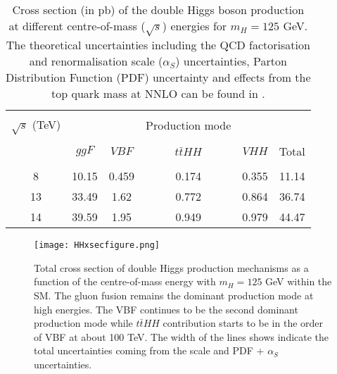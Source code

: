 \begin{table*}[ht]
	{\setlength{\tabcolsep}{14pt}
		\caption[Cross section (in pb) of the double Higgs boson production at different centre-of-mass ($\sqrt{s}$) energies for $m_H=125$ GeV. The theoretical uncertainties including the QCD factorisation and renormalisation scale ($\alpha_S$) uncertainties, Parton Distribution Function (PDF) uncertainty and effects from the top quark mass at NNLO can be found in the reference.]{Cross section (in pb) of the double Higgs boson production at different centre-of-mass ($\sqrt{s}$) energies for $m_H=125$ GeV. The theoretical uncertainties including the QCD factorisation and renormalisation scale ($\alpha_S$) uncertainties, Parton Distribution Function (PDF) uncertainty and effects from the top quark mass at NNLO can be found in \cite{higgs-br-vs-mH}.}
		\begin{center}
			\vspace{-6mm}
			\begin{tabular}{cccccc}
				\hline \\[-2.45ex] \hline \\[-2.1ex]
				$\sqrt{s}$ (TeV) &&&Production mode&&\\
				\hline \\[-1.8ex]
				& $ggF$ & $VBF$ & $t\bar tHH$ & $VHH$ & Total \\
				\hline \\[-1.8ex]
                8 & 10.15 & 0.459 & 0.174 & 0.355 & 11.14 \\
                13 & 33.49 & 1.62 & 0.772 & 0.864 & 36.74 \\
                14 & 39.59 & 1.95 & 0.949 & 0.979 & 44.47 \\
				\hline
			\end{tabular}
			\vspace{-6mm}
		\end{center}
		\label{HHxsecTable}}
\end{table*}

\begin{figure}[ht]
	\centering
	\texttt{[image: HHxsecfigure.png]}
	\vspace{2mm}
	\caption[Total cross section of double Higgs production mechanisms as a function of the centre-of-mass energy with $m_H = 125$ GeV within the SM. The gluon fusion remains the dominant production mode at high energies. The VBF continues to be the second dominant production mode while $t\bar tHH$ contribution starts to be in the order of VBF at about 100 TeV. The width of the lines shows indicate the total uncertainties coming from the scale and PDF + $\alpha_S$ uncertainties.]
	{Total cross section of double Higgs production mechanisms as a function of the centre-of-mass energy with $m_H = 125$ GeV within the SM. The gluon fusion remains the dominant production mode at high energies. The VBF continues to be the second dominant production mode while $t\bar tHH$ contribution starts to be in the order of VBF at about 100 TeV. The width of the lines shows indicate the total uncertainties coming from the scale and PDF + $\alpha_S$ uncertainties\cite{DiMicco:2690841}.}
	\label{HHxsecfigure}
\end{figure}

